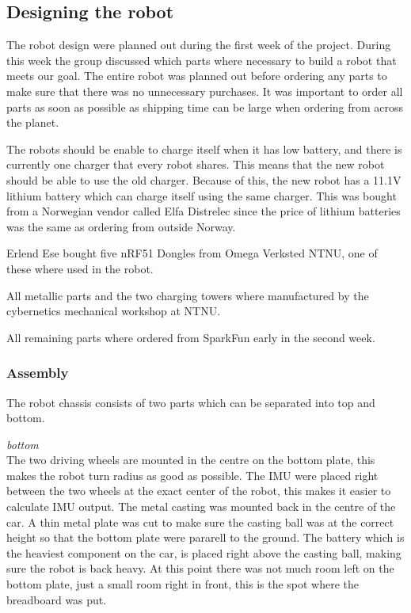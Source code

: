\subsection{Designing the robot}
The robot design were planned out during the first week of the project. During this week the group discussed which parts where necessary to build a robot that meets our goal. The entire robot was planned out before ordering any parts to make sure that there was no unnecessary purchases. It was important to order all parts as soon as possible as shipping time can be large when ordering from across the planet.

The robots should be enable to charge itself when it has low battery, and there is currently one charger that every robot shares. This means that the new robot should be able to use the old charger. Because of this, the new robot has a 11.1V lithium battery which can charge itself using the same charger. This was bought from a Norwegian vendor called Elfa Distrelec\cite{elfa} since the price of lithium batteries was the same as ordering from outside Norway.

Erlend Ese bought five nRF51 Dongles from Omega Verksted NTNU, one of these where used in the robot.

All metallic parts and the two charging towers where manufactured by the cybernetics mechanical workshop at NTNU.


All remaining parts where ordered from SparkFun early in the second week.


\subsubsection{Assembly}
The robot chassis consists of two parts which can be separated into top and bottom.

\textit{bottom}\\
The two driving wheels are mounted in the centre on the bottom plate, this makes the robot turn radius as good as possible. The IMU were placed right between the two wheels at the exact center of the robot, this makes it easier to calculate IMU output. The metal casting was mounted back in the centre of the car. A thin metal plate was cut to make sure the casting ball was at the correct height so that the bottom plate were pararell to the ground. The battery which is the heaviest component on the car, is placed right above the casting ball, making sure the robot is back heavy. At this point there was not much room left on the bottom plate, just a small room right in front, this is the spot where the breadboard was put.

